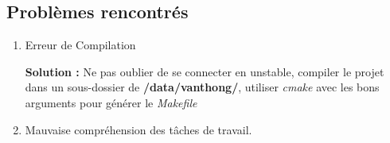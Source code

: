 \documentclass[12pt]{article}
\begin{document}
\subsection {Problèmes rencontrés}
    \begin{enumerate}
    \item Erreur de Compilation

    \textbf{Solution : } Ne pas oublier de se connecter en unstable, compiler le projet dans un sous-dossier de \textbf{/data/vanthong/}, utiliser \emph{cmake} avec les bons arguments pour générer le \emph{Makefile}
    \item Mauvaise compréhension des tâches de travail.
    \end {enumerate}
\end{document}
